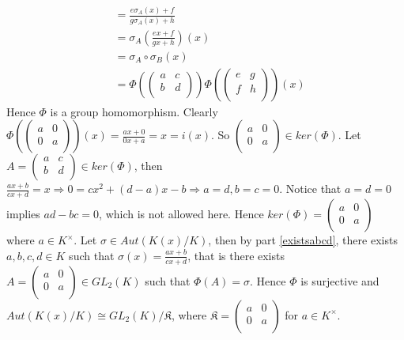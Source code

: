\begin{solution}
\begin{enumerate}[(i)]
\begin{align*}
				&= \frac{e\sigma_A(x)+f}{g\sigma_A(x)+h} \\
				&= \sigma_A(\frac{ex+f}{gx+h})(x) \\
				&= \sigma_A \circ \sigma_B (x) \\
				&= \Phi(\begin{pmatrix} a & c \\ b & d \\ \end{pmatrix}) \Phi(\begin{pmatrix} e & g \\ f & h \\ \end{pmatrix}) (x)
				\end{align*}
			\noindent Hence $\Phi$ is a group homomorphism. Clearly
			$\Phi(\begin{pmatrix} a & 0 \\ 0 & a \\ \end{pmatrix})(x) = \frac{ax + 0}{0x +a} = x = i(x)$. 
			So $\begin{pmatrix} a & 0 \\ 0 & a \\ \end{pmatrix} \in ker(\Phi)$. 
			Let $A = \begin{pmatrix} a & c \\ b & d \\ \end{pmatrix} \in ker(\Phi)$, 
			then $\frac{ax+b}{cx + d} = x \Rightarrow 0 = cx^2 + (d-a)x - b \Rightarrow a = d, b = c = 0$. 
			Notice that $a=d = 0$ implies $ad - bc = 0$, which is not allowed here. 
			Hence $ker(\Phi) = \begin{pmatrix} a & 0 \\ 0 & a \\ \end{pmatrix} $
			where $a \in K^{\times}$. Let $\sigma \in Aut(K(x)/K)$, 
			then by part \eqref{existsabcd}, there exists $a,b,c,d \in K$ such that 
			$\sigma(x) = \frac{ax+b}{cx+d}$, that is there exists 
			$A = \begin{pmatrix} a & 0 \\ 0 & a \\ \end{pmatrix} \in GL_2(K)$ such that 
			$\Phi(A) = \sigma$. Hence $\Phi$ is surjective and $Aut(K(x)/K) \cong GL_2(K)/\mathfrak{K}$,
			where $\mathfrak{K} = \begin{pmatrix} a & 0 \\ 0 & a \\ \end{pmatrix}$ for $a \in K^{\times}$.
	\end{enumerate}
\end{solution}
    

